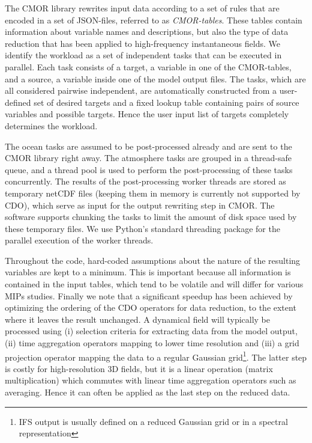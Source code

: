 \documentclass[procedia]{easychair}
\begin{document}
The CMOR library rewrites input data according to a set of rules that are 
encoded in a set of JSON-files, referred to as \emph{CMOR-tables}. These tables 
contain information about variable names and descriptions, but also the type of 
data reduction that has been applied to high-frequency instantaneous fields. We 
identify the workload as a set of independent tasks that can be executed in 
parallel. Each task consists of a target, a variable in one of the CMOR-tables, 
and a source, a variable inside one of the model output files. The tasks, which 
are all considered pairwise independent, are automatically constructed from a 
user-defined set of desired targets and a fixed lookup table containing pairs of 
source variables and possible targets. Hence the user input list of targets 
completely determines the workload. 

The ocean tasks are assumed to be post-processed already and are sent to the 
CMOR library right away. The atmosphere tasks are grouped in a thread-safe 
queue, and a thread pool is used to perform the post-processing of these 
tasks concurrently. The results of the post-processing worker threads are 
stored as temporary netCDF files (keeping them in memory is currently not 
supported by CDO), which serve as input for the output rewriting step in CMOR. 
The software supports chunking the tasks to limit the amount of disk space used 
by these temporary files. We use Python's standard threading package for the 
parallel execution of the worker threads.



Throughout the code, hard-coded assumptions about the nature of the resulting 
variables are kept to a minimum. This is important because all information is 
contained in the input tables, which tend to be volatile and will differ for 
various MIPs studies. Finally we note that a significant speedup has 
been achieved by optimizing the ordering of the CDO operators for data 
reduction, to the extent where it leaves the result unchanged. A dynamical 
field will typically be processed using (i) selection criteria for extracting 
data from the model output, (ii) time aggregation operators mapping to lower 
time resolution and (iii) a grid projection operator mapping the data to a 
regular Gaussian grid\footnote{IFS output is usually defined on a reduced 
Gaussian grid or in a spectral representation}. The latter step is costly for 
high-resolution 3D fields, but it is a linear operation (matrix multiplication) 
which commutes with linear time aggregation operators such as averaging. Hence 
it can often be applied as the last step on the reduced data.
\end{document}
